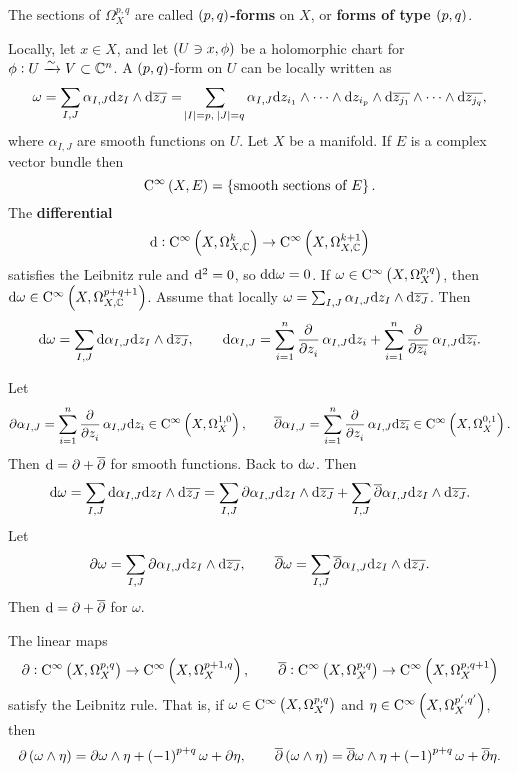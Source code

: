 \begin{definition}
The sections of $ \Omega_X^{p, q} $ are called \textbf{$ \br{p, q} $-forms} on $ X $, or \textbf{forms of type $ \br{p, q} $}.
\end{definition}

Locally, let $ x \in X $, and let $ \br{U \ni x, \phi} $ be a holomorphic chart for $ \phi : U \xrightarrow{\sim} V \subset \mathbb{C}^n $. A $ \br{p, q} $-form on $ U $ can be locally written as
$$ \omega = \sum_{I, J} \alpha_{I, J}\d z_I \wedge \d\overline{z_J} = \sum_{\abs{I} = p, \ \abs{J} = q} \alpha_{I, J}\d z_{i_1} \wedge \dots \wedge \d z_{i_p} \wedge \d\overline{z_{j_1}} \wedge \dots \wedge \d\overline{z_{j_q}}, $$
where $ \alpha_{I, J} $ are smooth functions on $ U $. Let $ X $ be a manifold. If $ E $ is a complex vector bundle then
$$ \C^\infty\br{X, E} = \cbr{\text{smooth sections of} \ E}. $$
The \textbf{differential}
$$ \d : \C^\infty\br{X, \Omega_{X, \CC}^k} \to \C^\infty\br{X, \Omega_{X, \CC}^{k + 1}} $$
satisfies the Leibnitz rule and $ \mathrm{d}^2 = 0 $, so $ \mathrm{d}\mathrm{d}\omega = 0 $. If $ \omega \in \C^\infty\br{X, \Omega_X^{p, q}} $, then $ \d\omega \in \C^\infty\br{X, \Omega_{X, \CC}^{p + q + 1}} $. Assume that locally $ \omega = \sum_{I, J} \alpha_{I, J}\mathrm{d} z_I \wedge \mathrm{d}\overline{z_J} $. Then
$$ \d\omega = \sum_{I, J} \d\alpha_{I, J}\d z_I \wedge \d\overline{z_J}, \qquad \d\alpha_{I, J} = \sum_{i = 1}^n \dpd{}{z_i}\alpha_{I, J}\d z_i + \sum_{i = 1}^n \dpd{}{\overline{z_i}}\alpha_{I, J}\d\overline{z_i}. $$

\pagebreak

Let
$$ \partial\alpha_{I, J} = \sum_{i = 1}^n \dpd{}{z_i}\alpha_{I, J}\d z_i \in \C^\infty\br{X, \Omega_X^{1, 0}}, \qquad \overline{\partial}\alpha_{I, J} = \sum_{i = 1}^n \dpd{}{z_i}\alpha_{I, J}\d\overline{z_i} \in \C^\infty\br{X, \Omega_X^{0, 1}}. $$
Then $ \mathrm{d} = \partial + \overline{\partial} $ for smooth functions. Back to $ \mathrm{d}\omega $. Then
$$ \mathrm{d}\omega = \sum_{I, J} \mathrm{d}\alpha_{I, J}\mathrm{d} z_I \wedge \mathrm{d}\overline{z_J} = \sum_{I, J} \partial\alpha_{I, J}\mathrm{d} z_I \wedge \mathrm{d}\overline{z_J} + \sum_{I, J} \overline{\partial}\alpha_{I, J}\mathrm{d} z_I \wedge \mathrm{d}\overline{z_J}. $$
Let
$$ \partial\omega = \sum_{I, J} \partial\alpha_{I, J}\mathrm{d} z_I \wedge \mathrm{d}\overline{z_J}, \qquad \overline{\partial}\omega = \sum_{I, J} \overline{\partial}\alpha_{I, J}\mathrm{d} z_I \wedge \mathrm{d}\overline{z_J}. $$
Then $ \mathrm{d} = \partial + \overline{\partial} $ for $ \omega $.

\begin{lemma}
The linear maps
$$ \partial : \C^\infty\br{X, \Omega_X^{p, q}} \to \C^\infty\br{X, \Omega_X^{p + 1, q}}, \qquad \overline{\partial} : \C^\infty\br{X, \Omega_X^{p, q}} \to \C^\infty\br{X, \Omega_X^{p, q + 1}} $$
satisfy the Leibnitz rule. That is, if $ \omega \in \C^\infty\br{X, \Omega_X^{p, q}} $ and $ \eta \in \C^\infty\br{X, \Omega_X^{p', q'}} $, then
$$ \partial\br{\omega \wedge \eta} = \partial\omega \wedge \eta + \br{-1}^{p + q}\omega + \partial\eta, \qquad \overline{\partial}\br{\omega \wedge \eta} = \overline{\partial}\omega \wedge \eta + \br{-1}^{p + q}\omega + \overline{\partial}\eta. $$
\end{lemma}

